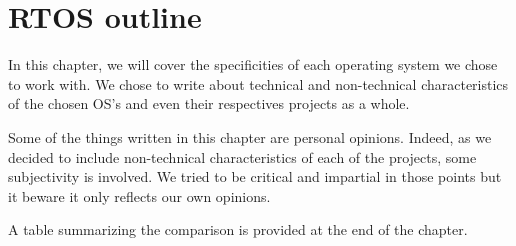 \chapter{RTOS outline}

In this chapter, we will cover the specificities of each operating system we chose to work with.
We chose to write about technical and non-technical characteristics of the chosen OS's and even their respectives projects as a whole.

Some of the things written in this chapter are personal opinions.
Indeed, as we decided to include non-technical characteristics of each of the projects, some subjectivity is involved.
We tried to be critical and impartial in those points but it beware it only reflects our own opinions.

A table summarizing the comparison is provided at the end of the chapter.






